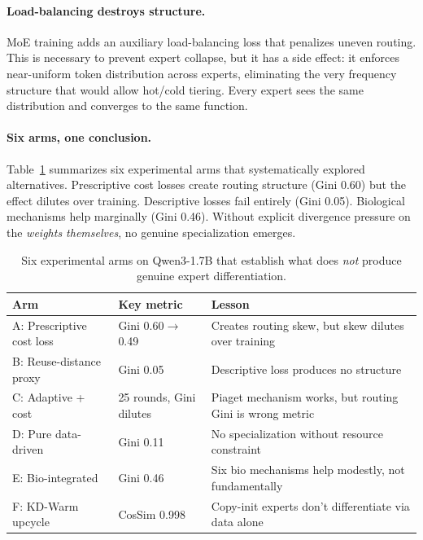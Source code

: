 \documentclass{article}
\begin{document}
\paragraph{Load-balancing destroys structure.}
MoE training adds an auxiliary load-balancing loss that penalizes uneven routing.
This is necessary to prevent expert collapse, but it has a side effect: it
enforces near-uniform token distribution across experts, eliminating the very
frequency structure that would allow hot/cold tiering. Every expert sees the
same distribution and converges to the same function.

\paragraph{Six arms, one conclusion.}
Table~\ref{tab:lessons} summarizes six experimental arms that systematically
explored alternatives. Prescriptive cost losses create routing structure (Gini
0.60) but the effect dilutes over training. Descriptive losses fail entirely
(Gini 0.05). Biological mechanisms help marginally (Gini 0.46). Without
explicit divergence pressure on the \emph{weights themselves}, no genuine
specialization emerges.

\begin{table}[t]
\centering
\caption{Six experimental arms on Qwen3-1.7B that establish what does \emph{not}
produce genuine expert differentiation.}
\label{tab:lessons}
\begin{tabular}{@{}llp{6.5cm}@{}}
\toprule
Arm & Key metric & Lesson \\
\midrule
A: Prescriptive cost loss  & Gini 0.60$\to$0.49 & Creates routing skew, but skew dilutes over training \\
B: Reuse-distance proxy     & Gini 0.05           & Descriptive loss produces no structure \\
C: Adaptive + cost          & 25 rounds, Gini dilutes & Piaget mechanism works, but routing Gini is wrong metric \\
D: Pure data-driven         & Gini 0.11           & No specialization without resource constraint \\
E: Bio-integrated           & Gini 0.46           & Six bio mechanisms help modestly, not fundamentally \\
F: KD-Warm upcycle          & CosSim 0.998        & Copy-init experts don't differentiate via data alone \\
\bottomrule
\end{tabular}
\end{table}
\end{document}

